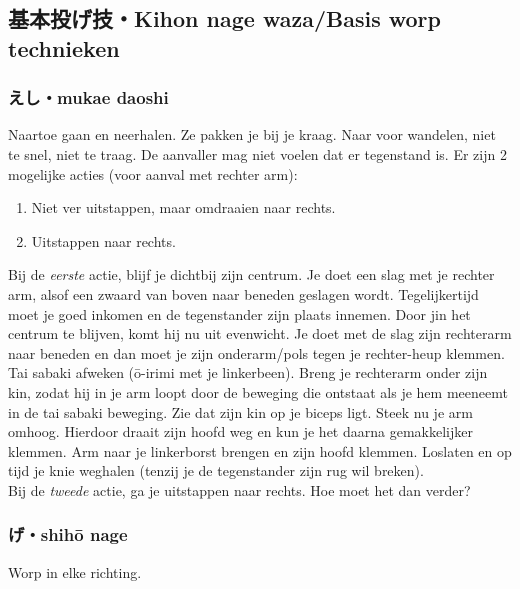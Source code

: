 \subsection{基本投げ技・Kihon nage waza/Basis worp technieken}
\subsubsection{えし・mukae daoshi}
Naartoe gaan en neerhalen. Ze pakken je bij je kraag. Naar voor wandelen, niet te snel, niet te traag. De aanvaller mag niet voelen dat er tegenstand is. Er zijn 2 mogelijke acties (voor aanval met rechter arm):\\
\begin{enumerate}
    \item{Niet ver uitstappen, maar omdraaien naar rechts.}
    \item{Uitstappen naar rechts.}
\end{enumerate}
Bij de \textit{eerste} actie, blijf je dichtbij zijn centrum. Je doet een slag met je rechter arm, alsof een zwaard van boven naar beneden geslagen wordt. Tegelijkertijd moet je goed inkomen en de tegenstander zijn plaats innemen. Door jin het centrum te blijven, komt hij nu uit evenwicht. Je doet met de slag zijn rechterarm naar beneden en dan moet je zijn onderarm/pols tegen je rechter-heup klemmen. Tai sabaki afweken (\={o}-irimi met je linkerbeen). Breng je rechterarm onder zijn kin, zodat hij in je arm loopt door de beweging die ontstaat als je hem meeneemt in de tai sabaki beweging. Zie dat zijn kin op je biceps ligt. Steek nu je arm omhoog. Hierdoor draait zijn hoofd weg en kun je het daarna gemakkelijker klemmen. Arm naar je linkerborst brengen en zijn hoofd klemmen. Loslaten en op tijd je knie weghalen (tenzij je de tegenstander zijn rug wil breken).\\
Bij de \textit{tweede} actie, ga je uitstappen naar rechts. Hoe moet het dan verder?


\subsubsection{げ・shih\={o} nage}
Worp in elke richting.

